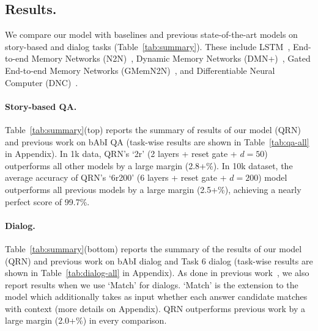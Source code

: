 \documentclass[table]{article}
\begin{document}
\subsection{Results.}\label{subsec:results}
We compare our model with baselines and previous state-of-the-art models on story-based and dialog tasks (Table~\ref{tab:summary}). 
These include LSTM~\citep{lstm}, End-to-end Memory Networks (N2N)~\citep{memN2N}, Dynamic Memory Networks (DMN+)~\citep{DMN+}, Gated End-to-end Memory Networks (GMemN2N)~\citep{perez2016gated}, and Differentiable Neural Computer (DNC)~\citep{graves2016hybrid}. 

\paragraph{Story-based QA.} Table~\ref{tab:summary}(top) reports the summary of results of our model (QRN) and previous work on bAbI QA
(task-wise results are shown in Table~\ref{tab:qa-all} in Appendix).
In 1k data, QRN's `2r' (2 layers + reset gate + $d=50$) outperforms all other models by a large margin (2.8+\%).
In 10k dataset, the average accuracy of QRN's `6r200' (6 layers + reset gate + $d=200$) model outperforms all previous models by a large margin (2.5+\%), achieving a nearly perfect score of 99.7\%.

\paragraph{Dialog.}
 Table~\ref{tab:summary}(bottom) reports the summary of the results of our model (QRN) and previous work on bAbI dialog and Task 6 dialog (task-wise results are shown in Table~\ref{tab:dialog-all} in Appendix).
As done in previous work~\citep{bordes2016learning, perez2016gated}, we also report results when we use `Match' for dialogs. `Match' is the extension to the model which additionally takes as input whether each answer candidate matches with context (more details on Appendix).  QRN outperforms  previous work by a large margin (2.0+\%) in every comparison.
\end{document}
